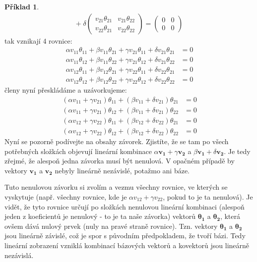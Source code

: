 \documentclass[a5paper,12pt]{amsbook}
\theoremstyle{definition}
\newtheorem{example}{Příklad}[chapter]
\newcommand{\myvec}[1]{\mathbf{#1}}
\begin{document}
\begin{example}
\begin{equation*}
\begin{split}
+\; \delta\left(\begin{array}{cc}v_{21}\theta_{21} & v_{21}\theta_{22} \\ v_{22}\theta_{21} & v_{22}\theta_{22}\end{array}\right)
= \left(\begin{array}{cc} 0 & 0 \\ 0 & 0 \end{array}\right)
\end{split}
\end{equation*}
tak vznikají 4 rovnice:
\begin{equation*}
\begin{split}
\alpha v_{11}\theta_{11} + \beta v_{11}\theta_{21} + \gamma v_{21}\theta_{11} + \delta v_{21}\theta_{21} &= 0 \\
\alpha v_{11}\theta_{12} + \beta v_{11}\theta_{22} + \gamma v_{21}\theta_{12} + \delta v_{21}\theta_{22} &= 0 \\
\alpha v_{12}\theta_{11} + \beta v_{12}\theta_{21} + \gamma v_{22}\theta_{11} + \delta v_{22}\theta_{21} &= 0 \\
\alpha v_{12}\theta_{12} + \beta v_{12}\theta_{22} + \gamma v_{22}\theta_{12} + \delta v_{22}\theta_{22} &= 0
\end{split}
\end{equation*}
členy nyní přeskládáme a uzávorkujeme:
\begin{equation*}
\begin{split}
(\alpha v_{11} + \gamma v_{21})\theta_{11} + (\beta v_{11} + \delta v_{21})\theta_{21} &= 0 \\
(\alpha v_{11} + \gamma v_{21})\theta_{12} + (\beta v_{11} + \delta v_{21})\theta_{22} &= 0 \\
(\alpha v_{12} + \gamma v_{22})\theta_{11} + (\beta v_{12} + \delta v_{22})\theta_{21} &= 0 \\
(\alpha v_{12} + \gamma v_{22})\theta_{12} + (\beta v_{12} + \delta v_{22})\theta_{22} &= 0
\end{split}
\end{equation*}
Nyní se pozorně podívejte na obsahy závorek. Zjistíte, že se tam po všech potřebných složkách
objevují lineární kombinace $\alpha\myvec{v_1} + \gamma\myvec{v_2}$
a $\beta\myvec{v_1} + \delta\myvec{v_2}$. Je tedy zřejmé, že alespoň jedna závorka musí být nenulová.
V opačném případě by vektory $\myvec{v_1}$ a $\myvec{v_2}$ nebyly lineárně nezávislé, potažmo ani
báze.

Tuto nenulovou závorku si zvolím a vezmu všechny rovnice, ve kterých se vyskytuje (např. všechny rovnice,
kde je $\alpha v_{12} + \gamma v_{22}$, pokud to je ta nenulová). Je vidět, že tyto rovnice určují po
složkách nenulovou lineární kombinaci (alespoň jeden z koeficientů je nenulový - to je ta naše závorka)
vektorů $\myvec{\theta_1}$ a $\myvec{\theta_2}$, která ovšem dává nulový prvek (nuly na pravé straně rovnice).
Tzn. vektory $\myvec{\theta_1}$ a $\myvec{\theta_2}$ jsou lineárně závislé, což je spor s původním předpokladem,
že tvoří bázi. Tedy lineární zobrazení vzniklá kombinací bázových vektorů a kovektorů jsou lineárně nezávislá.

\end{example}
\end{document}
